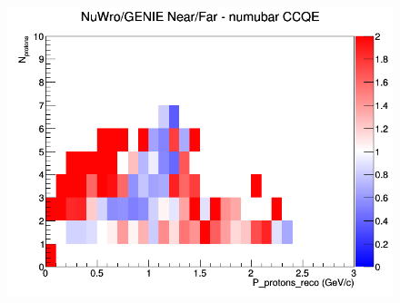 \begin{figure}[h]
\endminipage
{}
\includegraphics[width=\linewidth]{eff_N_P/FGT/protons/ratios/CCQE_NuWro_GENIE_numubar_NF_N_P.png}
\endminipage
\newline
\end{figure}
\clearpage
